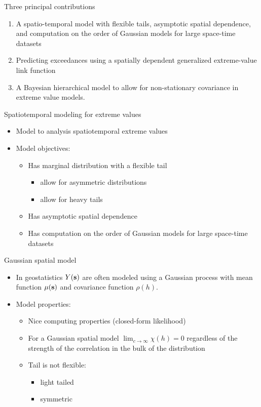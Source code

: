 \documentclass{beamer}
\begin{document}
\begin{frame}{Three principal contributions}
  \begin{enumerate}[1] \setlength{\itemsep}{0.5em}
    \item A spatio-temporal model with flexible tails, asymptotic spatial dependence, and computation on the order of Gaussian models for large space-time datasets
    \item Predicting exceedances using a spatially dependent generalized extreme-value link function
    \item A Bayesian hierarchical model to allow for non-stationary covariance in extreme value models.
  \end{enumerate}
\end{frame}

\begin{frame}{Spatiotemporal modeling for extreme values}
  \begin{itemize} \setlength{\itemsep}{0.5em}
    \item Model to analysis spatiotemporal extreme values
    \item Model objectives:
    \begin{itemize}
      \item Has marginal distribution with a flexible tail
      \begin{itemize}
        \item allow for asymmetric distributions
        \item allow for heavy tails
      \end{itemize}
      \item Has asymptotic spatial dependence
      \item Has computation on the order of Gaussian models for large space-time datasets
    \end{itemize}
  \end{itemize}
\end{frame}

\begin{frame}{Gaussian spatial model}
  \begin{itemize} \setlength{\itemsep}{0.5em}
    \item In geostatistics $Y(\mbox{\bf s})$ are often modeled using a Gaussian process with mean function $\mu(\mbox{\bf s})$ and covariance function $\rho(h)$.
    \item Model properties:
    \begin{itemize}
      \item Nice computing properties (closed-form likelihood)
      \item For a Gaussian spatial model $\lim_{c \rightarrow \infty} \chi(h) = 0$ regardless of the strength of the correlation in the bulk of the distribution
      \item Tail is not flexible:
      \begin{itemize}
        \item light tailed
        \item symmetric
      \end{itemize}
    \end{itemize}
  \end{itemize}
\end{frame}
\end{document}
